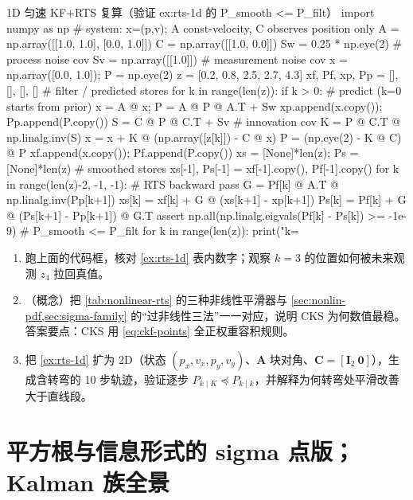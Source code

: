 \begin{codebox}[Python]{1D 匀速 KF+RTS 复算（验证 ex:rts-1d 的 P\_smooth <= P\_filt）}
import numpy as np
# system: x=(p,v); A const-velocity, C observes position only
A = np.array([[1.0, 1.0], [0.0, 1.0]])
C = np.array([[1.0, 0.0]])
Sw = 0.25 * np.eye(2)          # process noise cov
Sv = np.array([[1.0]])         # measurement noise cov
x = np.array([0.0, 1.0]); P = np.eye(2)
z = [0.2, 0.8, 2.5, 2.7, 4.3]
xf, Pf, xp, Pp = [], [], [], []          # filter / predicted stores
for k in range(len(z)):
    if k > 0:                            # predict (k=0 starts from prior)
        x = A @ x; P = A @ P @ A.T + Sw
    xp.append(x.copy()); Pp.append(P.copy())
    S = C @ P @ C.T + Sv                 # innovation cov
    K = P @ C.T @ np.linalg.inv(S)
    x = x + K @ (np.array([z[k]]) - C @ x)
    P = (np.eye(2) - K @ C) @ P
    xf.append(x.copy()); Pf.append(P.copy())
xs = [None]*len(z); Ps = [None]*len(z)   # smoothed stores
xs[-1], Ps[-1] = xf[-1].copy(), Pf[-1].copy()
for k in range(len(z)-2, -1, -1):        # RTS backward pass
    G = Pf[k] @ A.T @ np.linalg.inv(Pp[k+1])
    xs[k] = xf[k] + G @ (xs[k+1] - xp[k+1])
    Ps[k] = Pf[k] + G @ (Ps[k+1] - Pp[k+1]) @ G.T
    assert np.all(np.linalg.eigvals(Pf[k] - Ps[k]) >= -1e-9)  # P_smooth <= P_filt
for k in range(len(z)):
    print("k=%
\end{codebox}

\begin{practice}
\begin{enumerate}
  \item 跑上面的代码框，核对 \cref{ex:rts-1d} 表内数字；观察 $k=3$ 的位置如何被未来观测 $z_4$ 拉回真值。
  \item （概念）把 \cref{tab:nonlinear-rts} 的三种非线性平滑器与 \cref{sec:nonlin-pdf,sec:sigma-family} 的“过非线性三法”一一对应，说明 CKS 为何数值最稳。答案要点：CKS 用 \cref{eq:ckf-points} 全正权重容积规则。
  \item 把 \cref{ex:rts-1d} 扩为 2D（状态 $(p_x,v_x,p_y,v_y)$、$\mathbf{A}$ 块对角、$\mathbf{C}=[\mathbf{I}_2\ \mathbf{0}]$），生成含转弯的 10 步轨迹，验证逐步 $P_{k\mid K}\preceq P_{k\mid k}$，并解释为何转弯处平滑改善大于直线段。
\end{enumerate}
\end{practice}

\section{平方根与信息形式的 sigma 点版；Kalman 族全景}
\label{sec:srukf-panorama}

